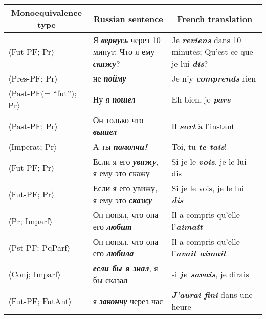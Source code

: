 \begin{table}[b]\small
\vspace*{-24pt}
\begin{center}
\vspace*{2ex}

\begin{tabular}{lp{56mm}p{50mm}}
\hline
\multicolumn{1}{c}{Monoequivalence type}&\multicolumn{1}{c}{Russian 
sentence}&\multicolumn{1}{c}{French translation}\\
\hline
$\langle$Fut-PF; Pr$\rangle$&Я {\bfseries\textit{вернусь}} через 10 минут;\newline
Что я ему {\bfseries\textit{скажу}}?&Je {\bfseries\textit{reviens}} dans 10 minutes;\newline 
Qu'est ce que je lui {\bfseries\textit{dis}}?\\
$\langle$Pres-PF; Pr$\rangle$&не {\bfseries\textit{пойму}}&Je n'y {\bfseries\textit{comprends}} 
rien\\
\hline
$\langle$Past-PF(= ``fut''); Pr$\rangle$&Ну я {\bfseries\textit{пошел}}&Eh bien, je 
{\bfseries\textit{pars}}\\
$\langle$Past-PF; Pr$\rangle$&Он только что {\bfseries\textit{вышел}} &Il {\bfseries\textit{sort}} 
$\grave{\mbox{a}}$ l'instant\\
\hline
$\langle$Imperat; Pr$\rangle$&А ты {\bfseries\textit{помолчи!}}&Toi, tu {\bfseries\textit{te 
tais}}!\\
$\langle$Fut-PF; Pr$\rangle$&Если я его {\bfseries\textit{увижу}}, я ему это скажу&Si je le 
{\bfseries\textit{vois}}, je le lui dis\\
$\langle$Fut-PF; Pr$\rangle$&Если я его увижу, я ему это {\bfseries\textit{скажу}}&Si je le vois, je le lui 
{\bfseries\textit{dis}}\\
$\langle$Pr; Imparf$\rangle$&Он понял, что она его {\bfseries\textit{любит}}&Il a compris 
qu'elle l'{\bfseries\textit{aimait}}\\
\hline
$\langle$Pst-PF: PqParf$\rangle$&Он понял, что она его {\bfseries\textit{любила}}&Il a compris 
qu'elle l'{\bfseries\textit{avait aimait}}\\
$\langle$Conj; Imparf$\rangle$&{\bfseries\textit{если бы я знал}}, я бы сказал&si 
{\bfseries\textit{je savais}}, je dirais\\
\hline
$\langle$Fut-PF; FutAnt$\rangle$&я {\bfseries\textit{закончу}} через 
час&{\bfseries\textit{J'aurai fini}} dans une heure \\

\end{tabular}
\end{center}
\end{table}
